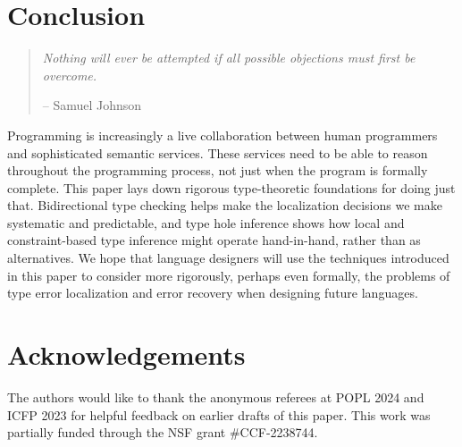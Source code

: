 \section{Conclusion}
\label{sec:conclusion}

\begin{quote}
    \emph{Nothing will ever be attempted if all possible objections must first be overcome.} 
    \begin{flushright}-- Samuel Johnson\end{flushright}
\end{quote}

Programming is increasingly a live collaboration between human programmers and sophisticated semantic services. These services need to be able to reason throughout the programming process, not just when the program is formally complete. This paper lays down rigorous type-theoretic foundations for doing just that. Bidirectional type checking helps make the localization decisions we make systematic and predictable, and type hole inference shows how local and constraint-based type inference might operate hand-in-hand, rather than as alternatives. 
We hope that language designers will use the techniques introduced in this paper to consider more rigorously, perhaps even formally, the problems of type error localization and error recovery when designing future languages. 

\section*{Acknowledgements}
The authors would like to thank the anonymous referees at POPL 2024 and ICFP 2023 for helpful feedback on earlier drafts of this paper.
This work was partially funded through the NSF grant \#CCF-2238744.

